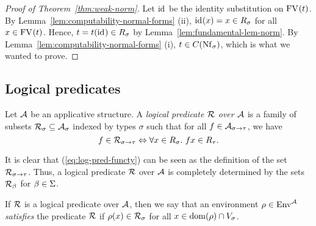 \begin{proof}[Proof of Theorem~\ref{thm:weak-norm}]
Let $\idsub$ be the identity substitution on $\FV{t}$. By Lemma~\ref{lem:computability-normal-forms} (ii), $\idsub(x) = x \in R_\sigma$ for all $x \in \FV{t}$. Hence, $t = \subst{t}{(\idsub)} \in R_\sigma$ by Lemma~\ref{lem:fundamental-lem-norm}. By Lemma~\ref{lem:computability-normal-forms} (i), $t \in \convset{\Nf[\sigma]}$, which is what we wanted to prove.
\end{proof}


\subsection{Logical predicates} \label{sec:logical-relations}


\begin{defn}
Let $\struct{A}$ be an applicative structure. A \emph{logical predicate $\struct{R}$ over $\struct{A}$} is a family of subsets $\scomp{\struct{R}}{\sigma} \subs \scomp{\struct{A}}{\sigma}$ indexed by types $\sigma$ such that for all $f \in \scomp{\struct{A}}{\functy{\sigma}{\tau}}$, we have
\begin{equation} \label{eq:log-pred-functy}
f \in \scomp{\struct{R}}{\functy{\sigma}{\tau}} \iff
    \forall x \in R_\sigma.\ f x \in R_\tau.
\end{equation}
\end{defn}

It is clear that (\ref{eq:log-pred-functy}) can be seen as the definition of the set $\scomp{\struct{R}}{\functy{\sigma}{\tau}}$. Thus, a logical predicate $\struct{R}$ over $\struct{A}$ is completely determined by the sets $\scomp{\struct{R}}{\beta}$ for $\beta \in \Basetypes$.

\begin{defn}
If $\struct{R}$ is a logical predicate over $\struct{A}$, then we say that an environment $\rho \in \Env[][\struct{A}]$ \emph{satisfies} the predicate $\struct{R}$ if $\rho(x) \in \scomp{\struct{R}}{\sigma}$ for all $x \in \dom{\rho} \cap \Var[\sigma]$.
\end{defn}

